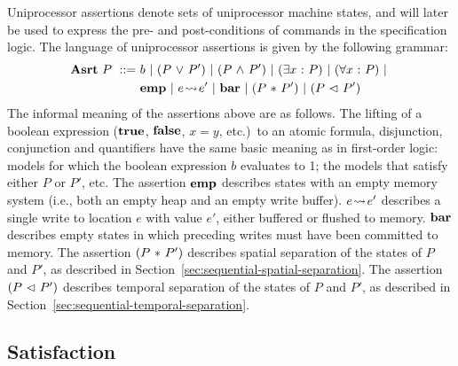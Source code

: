 \documentclass[11pt]{report}
\begin{document}
Uniprocessor assertions denote sets of uniprocessor machine states, and will later be used to express the pre- and post-conditions of commands in the specification logic. The language of uniprocessor assertions is given by the following grammar: \begin{align*}
    \mathbf{Asrt}~P ~::=~ & b ~|~ (P \operatorname{\,\vee\,} P') ~|~ (P \operatorname{\,\wedge\,} P') ~|~ (\exists x \operatorname{\,:\,} P) ~|~ (\forall x \operatorname{\,:\,} P) ~|~ \\ & \mathbf{emp} ~|~ e \!\leadsto\! e' ~|~ \mathbf{bar} ~|~ (P \operatorname{\,\ast\,} P') ~|~  (P \operatorname{\,\vartriangleleft\,} P')
\end{align*} 
The informal meaning of the assertions above are as follows. The lifting of a boolean expression ($\mathbf{true}$, $\mathbf{false}$, $x = y$, etc.)\ to an atomic formula, disjunction, conjunction and quantifiers have the same basic meaning as in first-order logic: models for which the boolean expression $b$ evaluates to 1; the models that satisfy either $P$ or $P'$, etc. The assertion $\mathbf{emp}$ describes states with an empty memory system (i.e., both an empty heap and an empty write buffer). $e \!\leadsto\! e'$ describes a single write to location $e$ with value $e'$, either buffered or flushed to memory. $\mathbf{bar}$ describes empty states in which preceding writes must have been committed to memory. The assertion $(P \operatorname{\,\ast\,} P')$ describes spatial separation of the states of $P$ and $P'$, as described in Section~\ref{sec:sequential-spatial-separation}. The assertion $(P \operatorname{\,\vartriangleleft\,} P')$ describes temporal separation of the states of $P$ and $P'$, as described in Section~\ref{sec:sequential-temporal-separation}. 

\subsection{Satisfaction}
\label{sec:uniprocessor-satisfaction}
\end{document}

